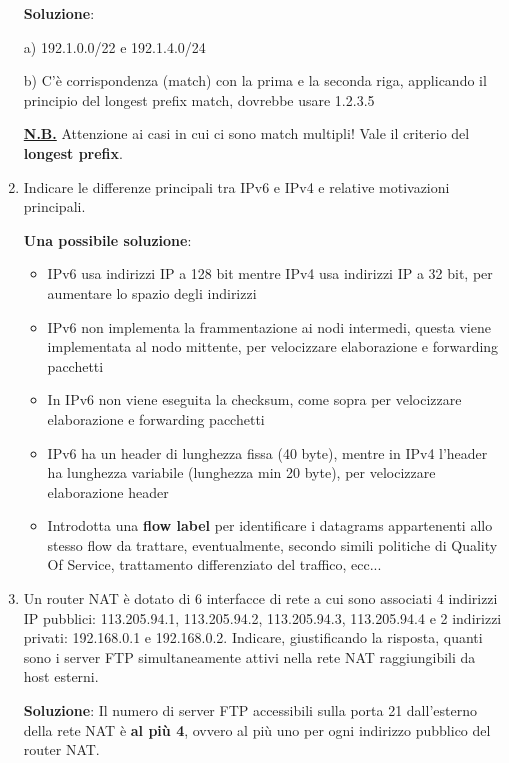 \documentclass[11pt,a4paper,oneside]{book}
\theoremstyle{definition}
\begin{document}
\begin{enumerate}
	      \pagebreak

	      \textbf{Soluzione}:

	      a) 192.1.0.0/22 e 192.1.4.0/24


	      b) C’è corrispondenza (match) con la prima e la seconda riga,
	      applicando il principio del longest prefix match, dovrebbe usare 1.2.3.5

	      \textbf{\underline{N.B.}} Attenzione ai casi in cui ci sono match multipli! Vale il criterio del \textbf{longest prefix}.

	\item Indicare le differenze principali tra IPv6 e IPv4
	      e relative motivazioni principali.

	      \textbf{Una possibile soluzione}:

	      \begin{itemize}
		      \item IPv6 usa indirizzi IP a 128 bit mentre IPv4 usa indirizzi IP a 32 bit, per
		            aumentare lo spazio degli indirizzi
		      \item IPv6 non implementa la frammentazione ai nodi intermedi, questa viene
		            implementata al nodo mittente, per velocizzare elaborazione e forwarding
		            pacchetti
		      \item In IPv6 non viene eseguita la checksum, come sopra per velocizzare
		            elaborazione e forwarding pacchetti
		      \item IPv6 ha un header di lunghezza fissa (40 byte), mentre in IPv4 l’header ha
		            lunghezza variabile (lunghezza min 20 byte), per velocizzare elaborazione
		            header
		      \item Introdotta una \textbf{flow label} per identificare i datagrams appartenenti allo stesso flow da trattare, eventualmente, secondo simili politiche di Quality Of Service, trattamento differenziato del traffico, ecc...
	      \end{itemize}

	\item Un router NAT è dotato di 6 interfacce di rete
	      a cui sono associati 4 indirizzi IP pubblici: 113.205.94.1, 113.205.94.2, 113.205.94.3, 113.205.94.4 e 2 indirizzi privati: 192.168.0.1 e 192.168.0.2. Indicare, giustificando la risposta, quanti sono i server FTP simultaneamente attivi nella rete NAT raggiungibili da host esterni.

	      \textbf{Soluzione}: Il numero di server FTP accessibili sulla porta 21
	      dall’esterno della rete NAT è \textbf{al più 4}, ovvero al più
	      uno per ogni indirizzo pubblico del router NAT.


\end{enumerate}
\end{document}
